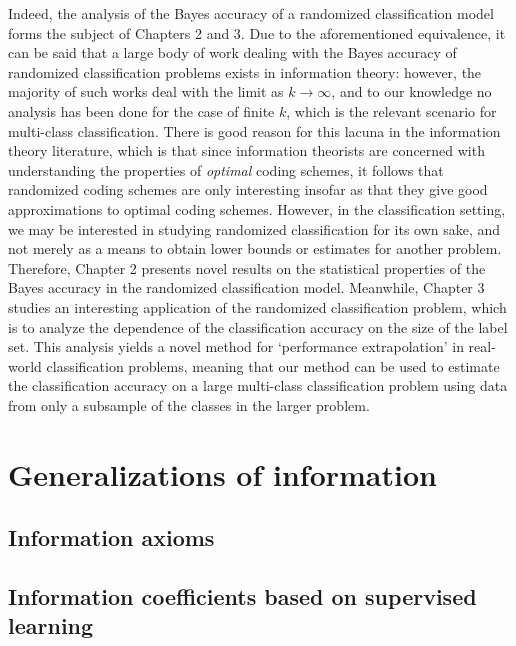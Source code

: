 Indeed, the analysis of the Bayes accuracy of a randomized
classification model forms the subject of Chapters 2 and 3.  Due to
the aforementioned equivalence, it can be said that a large body of
work dealing with the Bayes accuracy of randomized classification
problems exists in information theory: however, the majority of such
works deal with the limit as $k \to \infty$, and to our knowledge no
analysis has been done for the case of finite $k$, which is the
relevant scenario for multi-class classification.  There is good
reason for this lacuna in the information theory literature, which is
that since information theorists are concerned with understanding the
properties of \emph{optimal} coding schemes, it follows that
randomized coding schemes are only interesting insofar as that they
give good approximations to optimal coding schemes.  However, in the
classification setting, we may be interested in studying randomized
classification for its own sake, and not merely as a means to obtain
lower bounds or estimates for another problem.  Therefore, Chapter 2
presents novel results on the statistical properties of the Bayes
accuracy in the randomized classification model.  Meanwhile, Chapter 3
studies an interesting application of the randomized classification
problem, which is to analyze the dependence of the classification
accuracy on the size of the label set.  This analysis yields a novel
method for `performance extrapolation' in real-world classification
problems, meaning that our method can be used to estimate the
classification accuracy on a large multi-class classification problem
using data from only a subsample of the classes in the larger problem.








\section{Generalizations of information}

\subsection{Information axioms}

\subsection{Information coefficients based on supervised learning}

